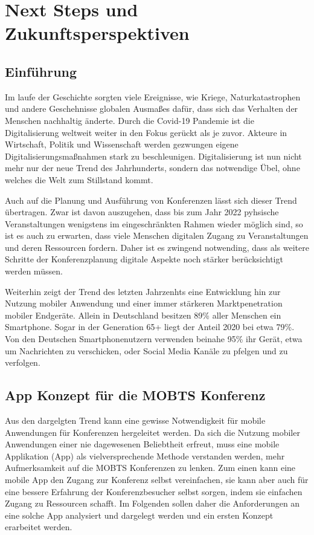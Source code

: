 \chapter{Next Steps und Zukunftsperspektiven}
\section{Einführung}
Im laufe der Geschichte sorgten viele Ereignisse, wie Kriege, Naturkatastrophen und andere Geschehnisse globalen Ausmaßes dafür, dass sich das Verhalten der Menschen nachhaltig änderte.
Durch die Covid-19 Pandemie ist die Digitalisierung weltweit weiter in den Fokus gerückt als je zuvor.
Akteure in Wirtschaft, Politik und Wissenschaft werden gezwungen eigene Digitalisierungsmaßnahmen stark zu beschleunigen.
Digitalisierung ist nun nicht mehr nur der neue Trend des Jahrhunderts, sondern das notwendige Übel, ohne welches die Welt zum Stillstand kommt.

Auch auf die Planung und Ausführung von Konferenzen lässt sich dieser Trend übertragen.
Zwar ist davon auszugehen, dass bis zum Jahr 2022 pyhsische Veranstaltungen wenigstens im eingeschränkten Rahmen wieder möglich sind, so ist es auch zu erwarten, dass viele Menschen digitalen Zugang zu Veranstaltungen und deren Ressourcen fordern.
Daher ist es zwingend notwending, dass als weitere Schritte der Konferenzplanung digitale Aspekte noch stärker berücksichtigt werden müssen.

Weiterhin zeigt der Trend des letzten Jahrzenhts eine Entwicklung hin zur Nutzung mobiler Anwendung und einer immer stärkeren Marktpenetration mobiler Endgeräte.
Allein in Deutschland besitzen 89\% aller Menschen ein Smartphone.
Sogar in der Generation 65+ liegt der Anteil 2020 bei etwa 79\%.
Von den Deutschen Smartphonenutzern verwenden beinahe 95\% ihr Gerät, etwa um Nachrichten zu verschicken, oder Social Media Kanäle zu pfelgen und zu verfolgen. \autocite[]{B_Gentner.2020}

\section{App Konzept für die \ac{MOBTS} Konferenz}
Aus den dargelgten Trend kann eine gewisse Notwendigkeit für mobile Anwendungen für Konferenzen hergeleitet werden.
Da sich die Nutzung mobiler Anwendungen einer nie dagewesenen Beliebtheit erfreut, muss eine mobile Applikation (App) als vielversprechende Methode verstanden werden, mehr Aufmerksamkeit auf die \ac{MOBTS} Konferenzen zu lenken.
Zum einen kann eine mobile App den Zugang zur Konferenz selbst vereinfachen, sie kann aber auch für eine bessere Erfahrung der Konferenzbesucher selbst sorgen, indem sie einfachen Zugang zu Ressourcen schafft.
Im Folgenden sollen daher die Anforderungen an eine solche App analysiert und dargelegt werden und ein ersten Konzept erarbeitet werden.

